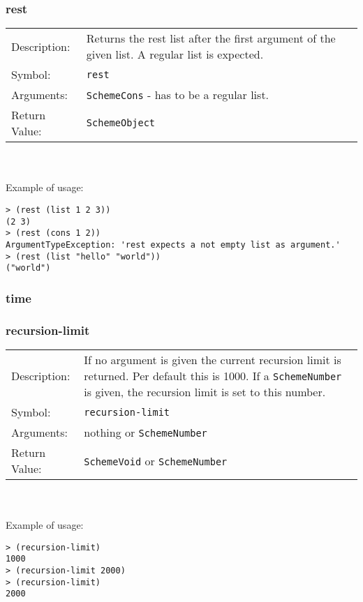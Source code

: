 \documentclass[12pt,a4paper]{scrartcl}
\begin{document}
\subsubsection*{rest}

\begin{tabular}{l  p{13cm}}
Description: & Returns the rest list after the first argument of the given list. A regular list is expected.\\
Symbol: & \lstinline{rest}\\
Arguments: & \lstinline{SchemeCons} - has to be a regular list.\\
Return Value: & \lstinline{SchemeObject}
\end{tabular}
\\
\\
Example of usage:
\begin{lstlisting}
> (rest (list 1 2 3))
(2 3)
> (rest (cons 1 2))
ArgumentTypeException: 'rest expects a not empty list as argument.'  
> (rest (list "hello" "world"))
("world")
\end{lstlisting}



\subsubsection*{time}

\subsubsection*{recursion-limit}
\begin{tabular}{l  p{13cm}}
Description: & If no argument is given the current recursion limit is returned. Per default this is 1000. If a \lstinline{SchemeNumber} is given, the recursion limit is set to this number.\\
Symbol: & \lstinline{recursion-limit}\\
Arguments: & nothing or \lstinline{SchemeNumber}\\
Return Value: & \lstinline{SchemeVoid} or \lstinline{SchemeNumber}
\end{tabular}
\\
\\
Example of usage:
\begin{lstlisting}
> (recursion-limit)
1000
> (recursion-limit 2000)
> (recursion-limit)
2000
\end{lstlisting}
\end{document}
